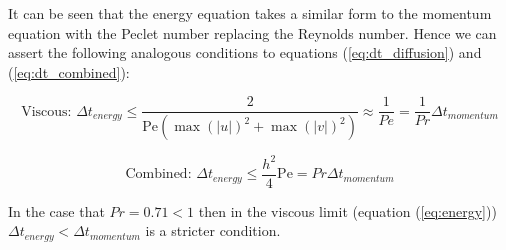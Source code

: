 \documentclass[10pt,a4paper]{article}
\begin{document}
It can be seen that the energy equation takes a similar form to the momentum equation with the Peclet number replacing the Reynolds number. Hence we can assert the following analogous conditions to equations (\ref{eq:dt_diffusion}) and (\ref{eq:dt_combined}):

\begin{equation}
\text{Viscous: } \Delta t_{energy} \leq \frac{2}{\text{Pe} \left(\max(|u|)^2 + \max(|v|)^2\right)}  \approx \frac{1}{Pe} = \frac{1}{Pr}\Delta t_{momentum}
\end{equation}

\begin{equation}
\label{eq:energy}
\text{Combined: } \Delta t_{energy} \leq \frac{h^2}{4} \text{Pe} = Pr \Delta t_{momentum}
\end{equation}

In the case that $Pr = 0.71 < 1$ then in the viscous limit (equation (\ref{eq:energy}))$\Delta t_{energy} < \Delta t_{momentum}$ is a stricter condition.





\newpage
\end{document}

